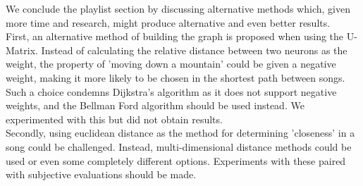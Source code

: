 We conclude the playlist section by discussing alternative methods which, given more time and research, might produce 
alternative and even better results. \\
First, an alternative method of building the graph is proposed when using the U-Matrix. Instead of calculating the relative distance between two neurons as the weight, the property of 'moving down a mountain' could be given a negative weight, making it more likely to be chosen in the shortest path between songs. Such a choice condemns Dijkstra's algorithm as it does not support negative weights, and the Bellman Ford algorithm should be used instead. We experimented with this but did not obtain results.\\
Secondly, using euclidean distance as the method for determining 'closeness' in a song could be challenged. Instead, multi-dimensional distance methods could be used or even some completely different options. Experiments with these paired with subjective evaluations should be made. \\




